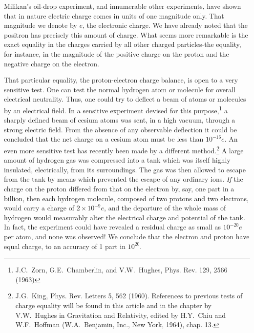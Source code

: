 Milikan's oil-drop experiment, and innumerable other
experiments, have shown that in nature electric charge comes in units of one
magnitude only. That magnitude we denote by $e$, the electronic charge. We have
already noted that the positron has precisely this amount of charge. What seems
more remarkable is the exact equality in the charges carried by all other
charged particles-the equality, for instance, in the magnitude of the positive
charge on the proton and the negative charge on the electron. 

That particular equality, the proton-electron charge
balance, is open to a very sensitive test. One can test the normal hydrogen
atom or molecule for overall electrical neutrality. Thus, one could try to
deflect a beam of atoms or molecules by an electrical field. In a sensitive
experiment devised for this purpose,\footnote{J.C.~Zorn, G.E.~Chamberlin,
and V.W.~Hughes, Phys. Rev. 129, 2566 (1963)} a sharply defined beam of cesium atoms was
sent, in a high vacuum, through a strong electric field. From the absence of
any observable deflection it could be concluded that the net charge on a cesium
atom must be less than $10^{-16}e$. An even more sensitive test has recently
been made by a different method.\footnote{J.G.~King, Phys. Rev. Letters 5, 562 (1960).
References to previous tests of charge equality will be found in this article and
in the chapter by V.W.~Hughes in Gravitation and Relativity, edited by H.Y.~Chiu and
W.F.~Hoffman (W.A.~Benjamin, Inc., New York, 1964), chap. 13.} A large amount of hydrogen gas was compressed
into a tank which was itself highly insulated, electrically, from its
surroundings. The gas was then allowed to escape from the tank by means which
prevented the escape of any ordinary ions. \emph{If} the charge on the proton
differed from that on the electron by, say, one part in a billion, then each
hydrogen molecule, composed of two protons and two electrons, would carry a
charge of $2\times 10^{-9}e$, and the departure of the whole mass of hydrogen would
measurably alter the electrical charge and potential of the tank. In fact, the
experiment could have revealed a residual charge as small as $10^{-20}e$ per
atom, and none was observed! We conclude that the electron and proton have
equal charge, to an accuracy of 1 part in $10^{20}$. 

